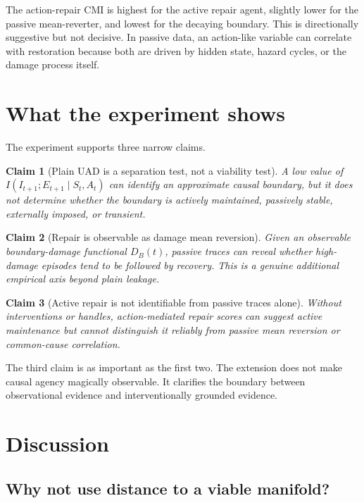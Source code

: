 \documentclass[11pt]{article}
\newtheorem{claim}{Claim}
\newcommand{\MI}{I}
\newcommand{\given}{\mid}
\begin{document}
The action-repair CMI is highest for the active repair agent, slightly lower for the passive mean-reverter, and lowest for the decaying boundary. This is directionally suggestive but not decisive. In passive data, an action-like variable can correlate with restoration because both are driven by hidden state, hazard cycles, or the damage process itself.

\section{What the experiment shows}

The experiment supports three narrow claims.

\begin{claim}[Plain UAD is a separation test, not a viability test]
A low value of $\MI(I_{t+1};E_{t+1}\given S_t,A_t)$ can identify an approximate causal boundary, but it does not determine whether the boundary is actively maintained, passively stable, externally imposed, or transient.
\end{claim}

\begin{claim}[Repair is observable as damage mean reversion]
Given an observable boundary-damage functional $D_B(t)$, passive traces can reveal whether high-damage episodes tend to be followed by recovery. This is a genuine additional empirical axis beyond plain leakage.
\end{claim}

\begin{claim}[Active repair is not identifiable from passive traces alone]
Without interventions or handles, action-mediated repair scores can suggest active maintenance but cannot distinguish it reliably from passive mean reversion or common-cause correlation.
\end{claim}

The third claim is as important as the first two. The extension does not make causal agency magically observable. It clarifies the boundary between observational evidence and interventionally grounded evidence.

\section{Discussion}

\subsection{Why not use distance to a viable manifold?}
\end{document}
